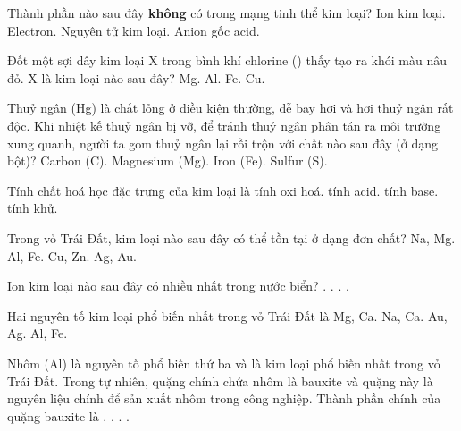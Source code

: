 \documentclass[11pt,a4paper]{article}
\def\loigiai#1{}
\begin{document}
\begin{ex}
Thành phần nào sau đây \textbf{không} có trong mạng tinh thể kim loại?
\choice
{Ion kim loại.}
{Electron.}
{Nguyên tử kim loại.}
{Anion gốc acid.}
\loigiai{}
\end{ex}

\begin{ex}
Đốt một sợi dây kim loại X trong bình khí chlorine () thấy tạo ra khói màu nâu đỏ. X là kim loại nào sau đây?
\choice
{Mg.}
{Al.}
{Fe.}
{Cu.}
\loigiai{}
\end{ex}

\begin{ex}
Thuỷ ngân (Hg) là chất lỏng ở điều kiện thường, dễ bay hơi và hơi thuỷ ngân rất độc. Khi nhiệt kế thuỷ ngân bị vỡ, để tránh thuỷ ngân phân tán ra môi trường xung quanh, người ta gom thuỷ ngân lại rồi trộn với chất nào sau đây (ở dạng bột)?
\choice
{Carbon (C).}
{Magnesium (Mg).}
{Iron (Fe).}
{Sulfur (S).}
\loigiai{}
\end{ex}

\begin{ex}
Tính chất hoá học đặc trưng của kim loại là
\choice
{tính oxi hoá.}
{tính acid.}
{tính base.}
{tính khử.}
\loigiai{}
\end{ex}

\begin{ex}
Trong vỏ Trái Đất, kim loại nào sau đây có thể tồn tại ở dạng đơn chất?
\choice
{Na, Mg.}
{Al, Fe.}
{Cu, Zn.}
{Ag, Au.}
\loigiai{}
\end{ex}

\begin{ex}
Ion kim loại nào sau đây có nhiều nhất trong nước biển?
\choice
{.}
{.}
{.}
{.}
\loigiai{}
\end{ex}

\begin{ex}
Hai nguyên tố kim loại phổ biến nhất trong vỏ Trái Đất là
\choice
{Mg, Ca.}
{Na, Ca.}
{Au, Ag.}
{Al, Fe.}
\loigiai{}
\end{ex}

\newpage

\begin{ex}
Nhôm (Al) là nguyên tố phổ biến thứ ba và là kim loại phổ biến nhất trong vỏ Trái Đất. Trong tự nhiên, quặng chính chứa nhôm là bauxite và quặng này là nguyên liệu chính để sản xuất nhôm trong công nghiệp. Thành phần chính của quặng bauxite là
\choice
{.}
{.}
{.}
{.}
\loigiai{}
\end{ex}
\end{document}
